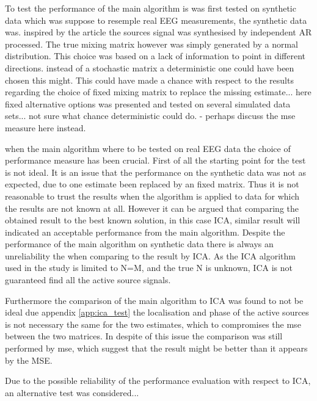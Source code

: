 To test the performance of the main algorithm is was first tested on synthetic data which was suppose to resemple real EEG measurements, the synthetic data was. inspired by the article \cite{cov} the sources signal was synthesised by independent AR processed. The true mixing matrix however was simply generated by a normal distribution. This choice was based on a lack of information to point in different directions. instead of a stochastic matrix a deterministic one could have been chosen this might. This could have made a chance with respect to the results regarding the choice of fixed mixing matrix to replace the missing estimate... here fixed alternative options was presented and tested on several simulated data sets... not sure what chance deterministic could do.
- perhaps discuss the mse measure here instead. 

when the main algorithm where to be tested on real EEG data the choice of performance measure has been crucial. First of all the starting point for the test is not ideal. It is an issue that the performance on the synthetic data was not as expected, due to one estimate been replaced by an fixed matrix. Thus it is not reasonable to trust the results when the algorithm is applied to data for which the results are not known at all. However it can be argued that comparing the obtained result to the best known solution, in this case ICA, similar result will indicated an acceptable performance from the main algorithm. 
Despite the performance of the main algorithm on synthetic data there is always an unreliability the when comparing to the result by ICA. As the ICA algorithm used in the study is limited to N=M, and the true N is unknown, ICA is not guaranteed find all the active source signals.
 
Furthermore the comparison of the main algorithm to ICA was found to not be ideal due appendix \ref{app:ica_test} the localisation and phase of the active sources is not necessary the same for the two estimates, which to compromises the mse between the two matrices. In despite of this issue the comparison was still performed by mse, which suggest that the result might be better than it appears by the MSE. 

Due to the possible reliability of the performance evaluation with respect to ICA, an alternative test was considered...  


